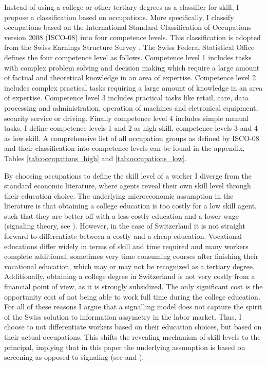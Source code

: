 \documentclass[]{article}
\begin{document}
Instead of using a college or other tertiary degrees as a classifier
for skill, I propose a classification based on occupations. More
specifically, I classify occupations based on the International
Standard Classification of Occupations version 2008 (ISCO-08) into
four competence levels. This classification is adopted from the Swiss
Earnings Structure Survey \citep{SwissStatisticalOffice.2016}. The
Swiss Federal Statistical Office defines the four competence level as
follows. Competence level 1 includes tasks with complex problem
solving and decision making which require a large amount of factual
and theoretical knowledge in an area of expertise. Competence level 2
includes complex practical tasks requiring a large amount of knowledge
in an area of expertise. Competence level 3 includes practical tasks
like retail, care, data processing and administration, operation of
machines and eletronical equipment, security service or
driving. Finally competence level 4 includes simple manual tasks. I
define competence levels 1 and 2 as high skill, competence levels 3
and 4 as low skill. A comprehensive list of all occupation groups as
defined by ISCO-08 and their classification into competence levels can
be found in the appendix, Tables \ref{tab:occupations_high} and
\ref{tab:occupations_low}.

By choosing occupations to define the skill level of a worker I
diverge from the standard economic literature, where agents reveal
their own skill level through their education choice. The underlying
microeconomic assumption in the literature is that obtaining a college
education is too costly for a low skill agent, such that they are
better off with a less costly education and a lower wage (signaling
theory, see \cite{Spence.1973}). However, in the case of Switzerland
it is not straight forward to differentiate between a costly and a
cheap education. Vocational educations differ widely in terms of skill
and time required and many workers complete additional, sometimes very
time consuming courses after finishing their vocational education,
which may or may not be recognized as a tertiary degree. Additionally,
obtaining a college degree in Switzerland is not very costly from a
financial point of view, as it is strongly subsidized. The only
significant cost is the opportunity cost of not being able to work
full time during the college education. For all of these reasons I
argue that a signalling model does not capture the spirit of the Swiss
solution to information assymetry in the labor market. Thus, I choose
to not differentiate workers based on their education choices, but
based on their actual occupations. This shifts the revealing mechanism
of skill levels to the principal, implying that in this paper the
underlying assumption is based on screening as opposed to signaling
(see \cite{Rothschild.1976} and \cite{Wilson.1977}).
\end{document}
